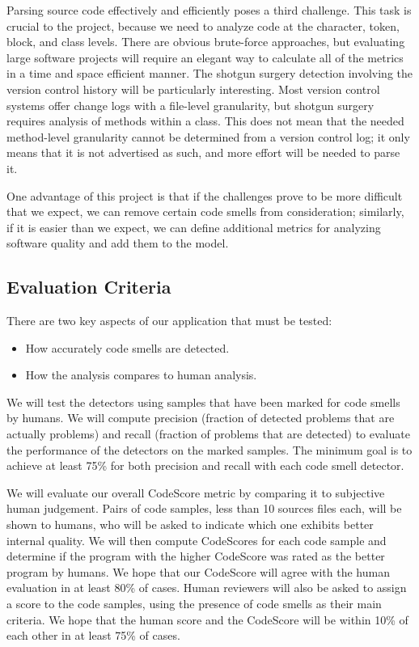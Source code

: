 \documentclass{sig-alternate}
\begin{document}
Parsing source code effectively and efficiently poses a third challenge. This task is crucial to the project, because we need to analyze code at the character, token, block, and class levels. There are obvious brute-force approaches, but evaluating large software projects will require an elegant way to calculate all of the metrics in a time and space efficient manner. The shotgun surgery detection involving the version control history will be particularly interesting. Most version control systems offer change logs with a file-level granularity, but shotgun surgery requires analysis of methods within a class. This does not mean that the needed method-level granularity cannot be determined from a version control log; it only means that it is not advertised as such, and more effort will be needed to parse it. 

One advantage of this project is that if the challenges prove to be more difficult that we expect, we can remove certain code smells from consideration; similarly, if it is easier than we expect, we can define additional metrics for analyzing software quality and add them to the model.

\subsection{Evaluation Criteria}
\label{subsec:eval_criteria}

There are two key aspects of our application that must be tested:

\begin{itemize}
\item How accurately code smells are detected.
\item How the analysis compares to human analysis.
\end{itemize}

We will test the detectors using samples that have been marked for code smells by humans. We will compute precision (fraction of detected problems that are actually problems) and recall (fraction of problems that are detected) to evaluate the performance of the detectors on the marked samples. The minimum goal is to achieve at least 75\% for both precision and recall with each code smell detector.  

We will evaluate our overall CodeScore metric by comparing it to subjective human judgement. Pairs of code samples, less than 10 sources files each, will be shown to humans, who will be asked to indicate which one exhibits better internal quality. We will then compute CodeScores for each code sample and determine if the program with the higher CodeScore was rated as the better program by humans. We hope that our CodeScore will agree with the human evaluation in at least 80\% of cases. Human reviewers will also be asked to assign a score to the code samples, using the presence of code smells as their main criteria. We hope that the human score and the CodeScore will be within 10\% of each other in at least 75\% of cases.
\end{document}

